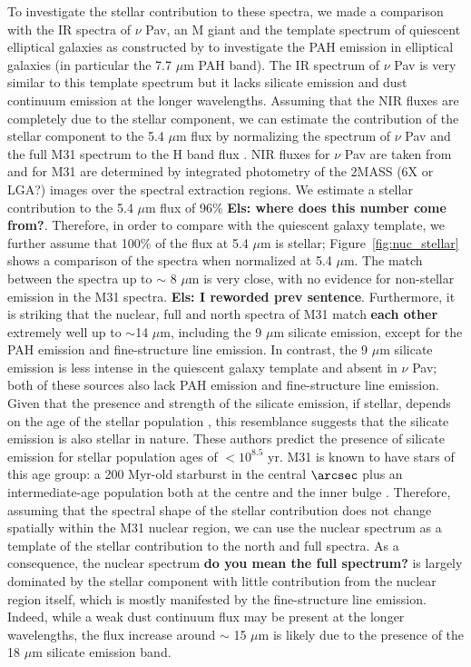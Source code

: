 To investigate the stellar contribution to these spectra, we made a comparison with the IR spectra of $\nu$ Pav, an M giant \citep{Sloan:15} and the template spectrum of quiescent elliptical galaxies as constructed by \citet{Kaneda:08} to investigate the PAH emission in elliptical galaxies (in particular the 7.7 $\mu$m PAH band). The IR spectrum of $\nu$ Pav is very similar to this template spectrum but it lacks silicate emission and dust continuum emission at the longer wavelengths. 
Assuming that the NIR fluxes are completely due to the stellar component, we can estimate the contribution of the stellar component to the 5.4 $\mu$m flux by normalizing the spectrum of $\nu$ Pav and the full M31 spectrum to the H band flux \citep[following][]{Vega:10}. NIR fluxes for $\nu$ Pav are taken from \citet{Gezari:99} and for M31 are determined by integrated photometry of the 2MASS (6X or LGA?) images over the spectral extraction regions. We estimate a stellar contribution to the 5.4 $\mu$m flux of  96\% {\bf Els: where does this number come from?}. Therefore, in order to compare with the quiescent galaxy template, we further assume that 100\% of the flux at 5.4 $\mu$m is stellar; Figure~\ref{fig:nuc_stellar} shows a comparison of the spectra when normalized at 5.4 $\mu$m. The match between the spectra up to $\sim$ 8 $\mu$m is very close, with no evidence for non-stellar emission in the M31 spectra. {\bf Els: I reworded prev sentence}. Furthermore, it is striking that the nuclear, full and north spectra of M31 match  {\bf each other} extremely well up to $\sim$14 $\mu$m, including the 9 $\mu$m silicate emission,  except for the PAH emission and fine-structure line emission. In contrast, the 9 $\mu$m silicate emission is less intense in the quiescent galaxy template and absent in $\nu$ Pav; both of these sources also lack PAH emission and fine-structure line emission. Given that the presence and strength of the silicate emission, if stellar, depends on the age of the stellar population \citep{Villaume:15}, this resemblance suggests that the silicate emission is also stellar in nature. These authors predict the presence of silicate emission for stellar population ages of $< 10^{8.5}$ yr.  M31 is known to have stars of this age group: a 200 Myr-old starburst in the central $\arcsec$ plus an intermediate-age population both at the centre and the inner bulge \citep{Bender:05, Saglia:10, Dong:15}.  Therefore, assuming that the spectral shape of the stellar contribution does not change spatially within the M31 nuclear region, we can use the nuclear spectrum as a template of the stellar contribution to the north and full spectra. As a consequence, the nuclear spectrum  {\bf do you mean the full spectrum?} is largely dominated by the stellar component with little contribution from the nuclear region itself, which is mostly manifested by the fine-structure line emission. Indeed, while a weak dust continuum flux may be present at the longer wavelengths, the flux increase around $\sim$ 15 $\mu$m is likely due to the presence of the 18 $\mu$m silicate emission band. 

